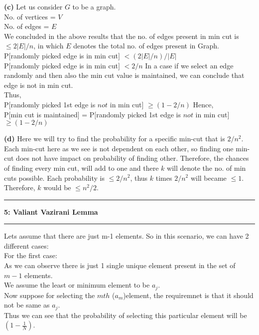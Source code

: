 \documentclass[11pt]{article}
\newcommand\question[2]{\vspace{.25in}\hrule\textbf{#1: #2}\vspace{.5em}\hrule\vspace{.10in}}
\renewcommand\part[1]{\vspace{.10in}\textbf{(#1)}}
\begin{document}
\part{c} Let us consider $G$ to be a graph.\\
No. of vertices = $V$\\
No. of  edges = $E$\\
We concluded in the above results that the no. of edges present in min cut is $\le 2|E|/n$, in which $E$ denotes the total no. of edges present in Graph.\\
P$[$randomly picked edge is in min cut$]$ $ < (2|E|/n)/|E|$\\
P$[$randomly picked edge is in min cut$]$ $ < 2/n$
In a case if we select an edge randomly and then also the min cut value is maintained, we can conclude that edge is not in min cut.\\
Thus,\\
P$[$randomly picked 1st edge is $not$ in min cut$]$ $ \ge (1-2/n)$
Hence,\\
P$[$min cut is maintained$]$ = P$[$randomly picked 1st edge is $not$ in min cut$]$\\
\hspace{125pt} $ \ge (1-2/n)$

\part{d}
Here we will try to find the probability for a specific min-cut that is $2/n^{2}$.\\
Each min-cut here as we see is not dependent on each other, so finding one min-cut does not have impact on probability of finding other. Therefore, the chances of finding every min cut, will add to one and there $k$ will denote the no. of min cuts possible. Each probability is $ \leq 2/n^{2}$, thus $k$ times $ 2/n^{2}$ will became $ \leq 1$. Therefore, $k$ would be $ \leq n^{2}/2$. \\ 

\question{5}{Valiant Vazirani Lemma}
Lets assume that there are just m-1 elements. So in this scenario, we can have 2 different cases:\\[15pt]
For the first case:\\
As we can observe there is just 1 single unique element present in the set of $m-1$ elements.\\
We assume the least or minimum element to be $a_{j}$.\\
Now suppose for selecting the $mth$ ($a_m$)element, the requiremnet is that it should not be same as $a_{j}$.\\ Thus we can see that the probability of selecting this particular element will be $(1-\frac{1}{N})$.\\[15pt]
\end{document}
